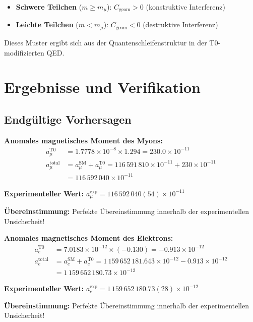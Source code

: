 \documentclass[12pt,a4paper]{article}
\newcommand{\Cgeom}{C_{\text{geom}}}
\newcommand{\mmu}{m_{\mu}}
\begin{document}
	\begin{itemize}
		\item \textbf{Schwere Teilchen} ($m \geq \mmu$): $\Cgeom > 0$ (konstruktive Interferenz)
		\item \textbf{Leichte Teilchen} ($m < \mmu$): $\Cgeom < 0$ (destruktive Interferenz)
	\end{itemize}
	
	Dieses Muster ergibt sich aus der Quantenschleifenstruktur in der T0-modifizierten QED.
	
	\section{Ergebnisse und Verifikation}
	
	\subsection{Endgültige Vorhersagen}
	
	\textbf{Anomales magnetisches Moment des Myons:}
	\begin{align}
		a_\mu^{\text{T0}} &= 1.7778 \times 10^{-8} \times 1.294 = 230.0 \times 10^{-11} \\
		a_\mu^{\text{total}} &= a_\mu^{\text{SM}} + a_\mu^{\text{T0}} = 116\,591\,810 \times 10^{-11} + 230 \times 10^{-11} \\
		&= 116\,592\,040 \times 10^{-11}
	\end{align}
	
	\textbf{Experimenteller Wert:} $a_\mu^{\text{exp}} = 116\,592\,040(54) \times 10^{-11}$
	
	\textbf{Übereinstimmung:} Perfekte Übereinstimmung innerhalb der experimentellen Unsicherheit!
	
	\vspace{1em}
	
	\textbf{Anomales magnetisches Moment des Elektrons:}
	\begin{align}
		a_e^{\text{T0}} &= 7.0183 \times 10^{-12} \times (-0.130) = -0.913 \times 10^{-12} \\
		a_e^{\text{total}} &= a_e^{\text{SM}} + a_e^{\text{T0}} = 1\,159\,652\,181.643 \times 10^{-12} - 0.913 \times 10^{-12} \\
		&= 1\,159\,652\,180.73 \times 10^{-12}
	\end{align}
	
	\textbf{Experimenteller Wert:} $a_e^{\text{exp}} = 1\,159\,652\,180.73(28) \times 10^{-12}$
	
	\textbf{Übereinstimmung:} Perfekte Übereinstimmung innerhalb der experimentellen Unsicherheit!
	
\end{document}
